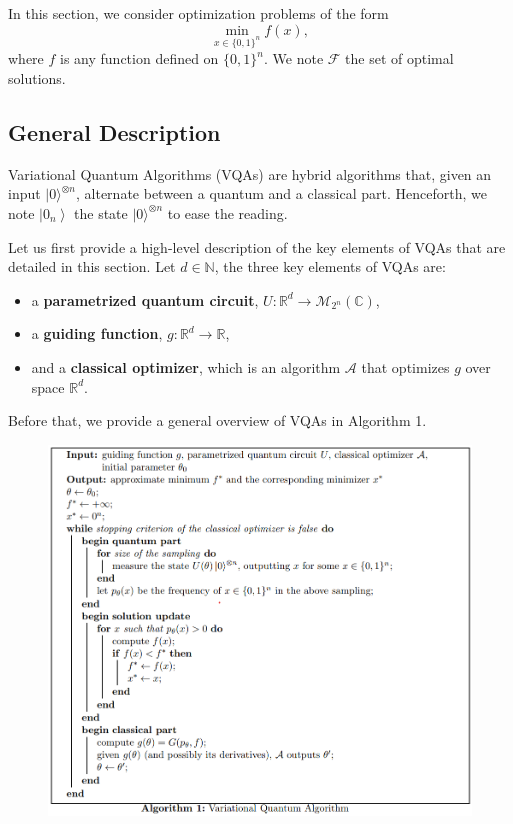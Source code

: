 In this section, we consider optimization problems of the form
\begin{equation}
    \min _{x \in\{0,1\}^{n}} f(x), \tag{1}
\end{equation}
where $f$ is any function defined on $\{0,1\}^{n}$. We note $\mathcal{F}$ the set of optimal solutions.

\subsection{General Description}

Variational Quantum Algorithms (VQAs) are hybrid algorithms that, given an input $|0\rangle^{\otimes n}$, alternate between a quantum and a classical part. Henceforth, we note $\left|0_{n}\right\rangle$ the state $|0\rangle^{\otimes n}$ to ease the reading. 

Let us first provide a high-level description of the key elements of VQAs that are detailed in this section. Let $d \in \mathbb{N}$, the three key elements of VQAs are:
\begin{itemize}
    \item a \textbf{parametrized quantum circuit}, $U: \mathbb{R}^{d} \rightarrow \mathcal{M}_{2^{n}}(\mathbb{C})$,
    \item a \textbf{guiding function}, $g: \mathbb{R}^{d} \rightarrow \mathbb{R}$,
    \item and a \textbf{classical optimizer}, which is an algorithm $\mathcal{A}$ that optimizes $g$ over space $\mathbb{R}^{d}$.
\end{itemize}
Before that, we provide a general overview of VQAs in Algorithm 1. 
\begin{figure}[h]
    \centering
    \includegraphics[width=1\linewidth]{Images/VQA-algorithm.png}
\end{figure}

